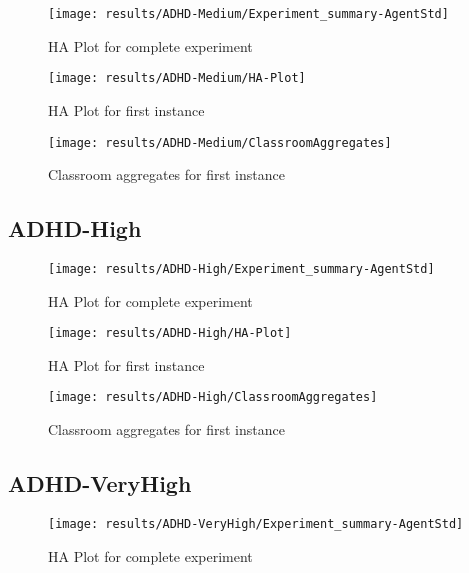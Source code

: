 \begin{figure}[H]
    \centering
    \texttt{[image: results/ADHD-Medium/Experiment\_summary-AgentStd]}
    \caption{HA Plot for complete experiment}
\end{figure}

\begin{figure}[H]
    \centering
    \texttt{[image: results/ADHD-Medium/HA-Plot]}
    \caption{HA Plot for first instance}
\end{figure}

\begin{figure}[H]
    \centering
    \texttt{[image: results/ADHD-Medium/ClassroomAggregates]}
    \caption{Classroom aggregates for first instance}
\end{figure}


\subsection{ADHD-High}

\begin{figure}[H]
    \centering
    \texttt{[image: results/ADHD-High/Experiment\_summary-AgentStd]}
    \caption{HA Plot for complete experiment}
\end{figure}

\begin{figure}[H]
    \centering
    \texttt{[image: results/ADHD-High/HA-Plot]}
    \caption{HA Plot for first instance}
\end{figure}

\begin{figure}[H]
    \centering
    \texttt{[image: results/ADHD-High/ClassroomAggregates]}
    \caption{Classroom aggregates for first instance}
    \label{result:H-Classroom}
\end{figure}


\subsection{ADHD-VeryHigh}

\begin{figure}[H]
    \centering
    \texttt{[image: results/ADHD-VeryHigh/Experiment\_summary-AgentStd]}
    \caption{HA Plot for complete experiment}
\end{figure}

